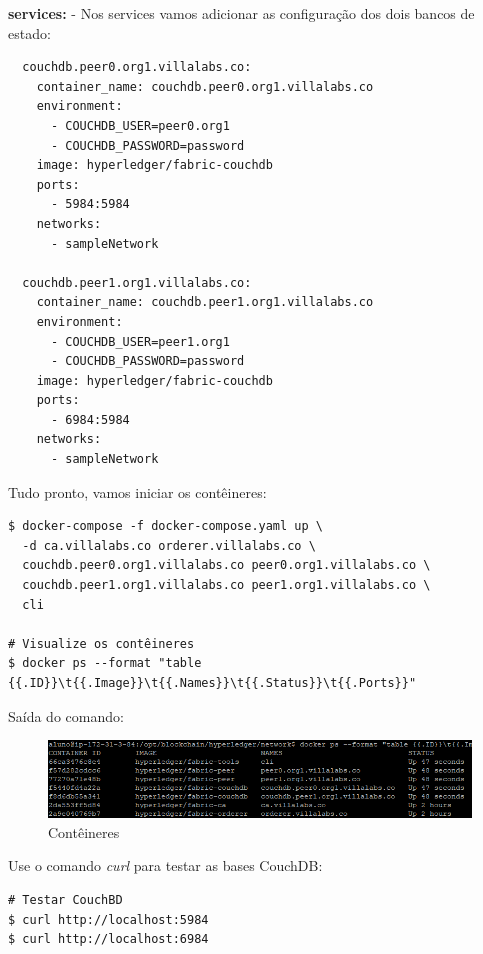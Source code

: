 \documentclass[a4paper,11pt]{article}
\begin{document}
\textbf{services:} - Nos services vamos adicionar as configuração dos dois bancos de estado:
\begin{lstlisting}
  couchdb.peer0.org1.villalabs.co:
    container_name: couchdb.peer0.org1.villalabs.co
    environment:
      - COUCHDB_USER=peer0.org1
      - COUCHDB_PASSWORD=password
    image: hyperledger/fabric-couchdb
    ports: 
      - 5984:5984
    networks: 
      - sampleNetwork

  couchdb.peer1.org1.villalabs.co:
    container_name: couchdb.peer1.org1.villalabs.co
    environment:
      - COUCHDB_USER=peer1.org1
      - COUCHDB_PASSWORD=password
    image: hyperledger/fabric-couchdb
    ports: 
      - 6984:5984
    networks: 
      - sampleNetwork
\end{lstlisting}

Tudo pronto, vamos iniciar os contêineres:
\begin{lstlisting}
$ docker-compose -f docker-compose.yaml up \
  -d ca.villalabs.co orderer.villalabs.co \
  couchdb.peer0.org1.villalabs.co peer0.org1.villalabs.co \
  couchdb.peer1.org1.villalabs.co peer1.org1.villalabs.co \
  cli

# Visualize os contêineres
$ docker ps --format "table {{.ID}}\t{{.Image}}\t{{.Names}}\t{{.Status}}\t{{.Ports}}"
\end{lstlisting}

Saída do comando:
\begin{figure}[H]
  \centering
  \includegraphics[width=1.1\textwidth]{imagens/conteineres-3.png}
  \caption{Contêineres}
\end{figure}

Use o comando \textit{curl} para testar as bases CouchDB:
\begin{lstlisting}
# Testar CouchBD
$ curl http://localhost:5984
$ curl http://localhost:6984
\end{lstlisting}
\end{document}
